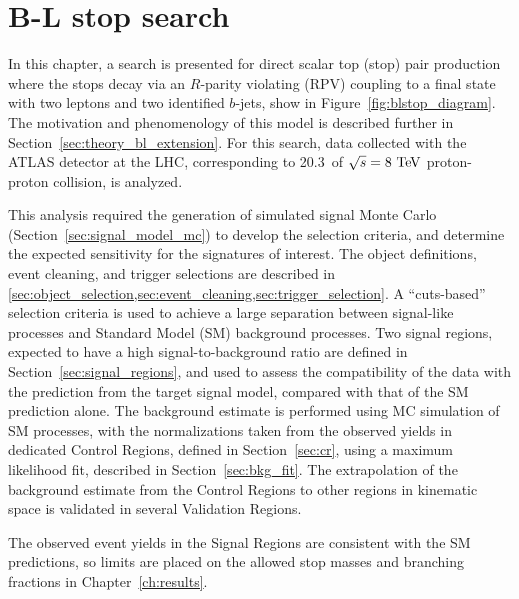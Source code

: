 \chapter[B-L stop search][B-L stop search]{B-L stop search}
\label{ch:bl_stop}

In this chapter, a search is presented for direct scalar top (stop) pair
production where the stops decay via an $R$-parity violating (RPV) coupling to
a final state with two leptons and two identified $b$-jets, show in
Figure~\ref{fig:blstop_diagram}.
The motivation and phenomenology of this model is described further in
Section~\ref{sec:theory_bl_extension}.
For this search, data collected with the ATLAS detector at the LHC,
corresponding to 20.3~\ifb of $\sqrt{s} = 8\TeV$ proton-proton collision, is
analyzed.

This analysis required the generation of simulated signal Monte Carlo 
(Section~\ref{sec:signal_model_mc}) to develop the selection criteria, and
determine the expected sensitivity for the signatures of interest.
The object definitions, event cleaning, and trigger selections are described in
\cref{sec:object_selection,sec:event_cleaning,sec:trigger_selection}.
A ``cuts-based'' selection criteria is used to achieve a large separation between
signal-like processes and Standard Model (SM) background processes.
Two signal regions, expected to have a high signal-to-background ratio are
defined in Section~\ref{sec:signal_regions}, and used to assess the
compatibility of the data with the prediction from the target signal model,
compared with that of the SM prediction alone.
The background estimate is performed using MC simulation of SM processes, with
the normalizations taken from the observed yields in dedicated Control Regions,
defined in Section~\ref{sec:cr}, using a maximum likelihood fit, described in
Section~\ref{sec:bkg_fit}.
The extrapolation of the background estimate from the Control Regions to other
regions in kinematic space is validated in several Validation Regions.

The observed event yields in the Signal Regions are consistent with the SM
predictions, so limits are placed on the allowed stop masses and branching
fractions in Chapter~\ref{ch:results}.


